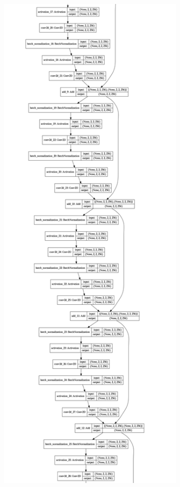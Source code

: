 \begin{figure}[ht]
\begin{subfigure}{.24\linewidth}
        \label{subfig:model1}
    \end{subfigure}
    \begin{subfigure}{.24\linewidth}
    \centering
        \includegraphics[scale=.1]{graphics/model_cropped_2.png}

\end{subfigure}
\end{figure}
